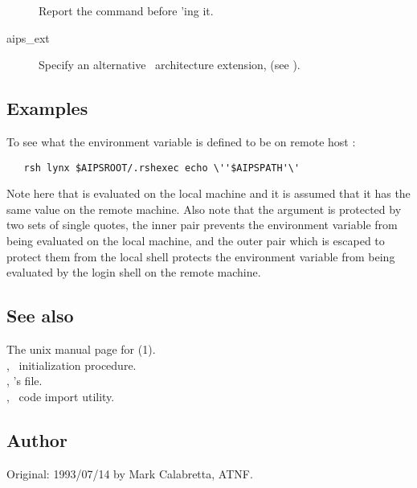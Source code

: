 \begin{description}
\item[]
   Report the command before 'ing it.

\item[ aips\_ext]
   Specify an alternative \aipspp\ architecture extension, 
   (see ).
\end{description}

\subsection*{Examples}

To see what the  environment variable is defined to be on
remote host :

\begin{verbatim}
   rsh lynx $AIPSROOT/.rshexec echo \''$AIPSPATH'\'
\end{verbatim}

\noindent
Note here that  is evaluated on the local machine and it is
assumed that it has the same value on the remote machine.  Also note that the
 argument is protected by two sets of single quotes, the
inner pair prevents the environment variable from being evaluated on the local
machine, and the outer pair which is escaped to protect them from the local
shell protects the environment variable from being evaluated by the login
shell on the remote machine.

\subsection*{See also}

The unix manual page for (1).\\
, \aipspp\ initialization procedure.\\
, 's  file.\\
, \aipspp\ code import utility.

\subsection*{Author}

Original: 1993/07/14 by Mark Calabretta, ATNF.
